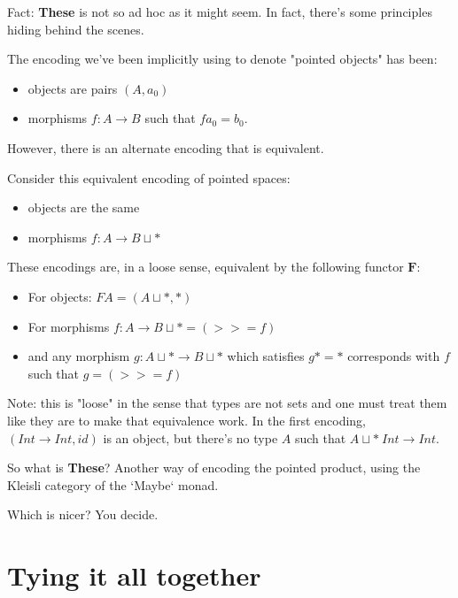 \documentclass[tikz]{beamer}
\theoremstyle{definition}
\begin{document}
\frame
{
	Fact: \textbf{These} is not so ad hoc as it might seem. In fact, there's some principles hiding behind the scenes.
}

\frame
{
	The encoding we've been implicitly using to denote "pointed objects" has been: 
	
	\begin{itemize}
		\item objects are pairs $(A, a_0)$
		\item morphisms $f : A \rightarrow B$ such that $f a_0 = b_0$. 
	\end{itemize}
	

However, there is an alternate encoding that is equivalent.
		
}

\frame
{
	Consider this equivalent encoding of pointed spaces: 
	\begin{itemize}
		\item objects are the same
		\item morphisms $f : A \rightarrow B \sqcup *$
	\end{itemize}
	
}

\frame
{
	These encodings are, in a loose sense, equivalent by the following functor $\mathbf{F}$: 
	
	\begin{itemize}
		\item For objects: $FA = (A \sqcup *, *)$
		\item For morphisms $f : A \rightarrow B \sqcup * = (>>= f) $
		\item and any morphism $g : A \sqcup * \rightarrow B \sqcup *$ which satisfies $g* = *$ corresponds with $f$ such that $g = (>>= f)$ 
	\end{itemize}
}	

\frame
{
	Note: this is "loose" in the sense that types are not sets and one must treat them like they are to make that equivalence work. In the first encoding, $(Int \rightarrow Int, id)$ is an object, but there's no type $A$ such that $A \sqcup * ~ Int \rightarrow Int$.
}

\frame
{
	So what is \textbf{These}? Another way of encoding the pointed product, using the Kleisli category of the `Maybe` monad. 
}

\frame
{
	Which is nicer? You decide.
}

\section{Tying it all together}
\end{document}
